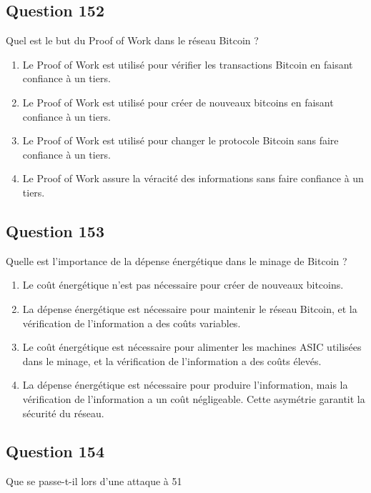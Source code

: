 \documentclass[12pt,a4paper]{article}
\begin{document}
\bigskip


\subsection*{Question 152}
Quel est le but du Proof of Work dans le réseau Bitcoin ?

\begin{enumerate}[label=\Alph*., leftmargin=*]
\item Le Proof of Work est utilisé pour vérifier les transactions Bitcoin en faisant confiance à un tiers.
\item Le Proof of Work est utilisé pour créer de nouveaux bitcoins en faisant confiance à un tiers.
\item Le Proof of Work est utilisé pour changer le protocole Bitcoin sans faire confiance à un tiers.
\item Le Proof of Work assure la véracité des informations sans faire confiance à un tiers.
\end{enumerate}

\bigskip


\subsection*{Question 153}
Quelle est l'importance de la dépense énergétique dans le minage de Bitcoin ?

\begin{enumerate}[label=\Alph*., leftmargin=*]
\item Le coût énergétique n'est pas nécessaire pour créer de nouveaux bitcoins.
\item La dépense énergétique est nécessaire pour maintenir le réseau Bitcoin, et la vérification de l'information a des coûts variables.
\item Le coût énergétique est nécessaire pour alimenter les machines ASIC utilisées dans le minage, et la vérification de l'information a des coûts élevés.
\item La dépense énergétique est nécessaire pour produire l'information, mais la vérification de l'information a un coût négligeable. Cette asymétrie garantit la sécurité du réseau.
\end{enumerate}

\bigskip


\subsection*{Question 154}
Que se passe-t-il lors d'une attaque à 51%
\end{document}
